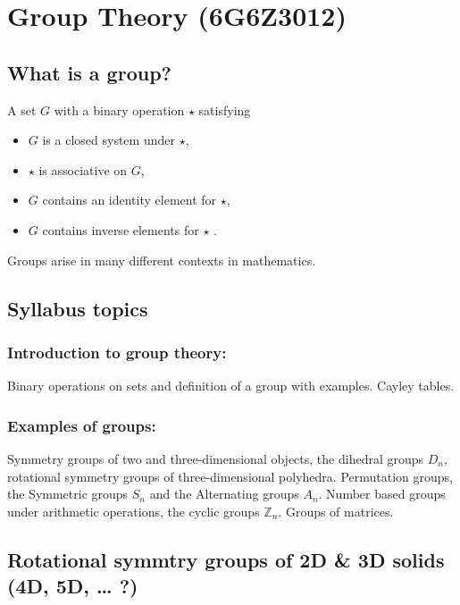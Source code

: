 \section{Group Theory (6G6Z3012)}\label{group-theory-6g6z3012}

\subsection{What is a group?}\label{what-is-a-group}

A set $G$ with a binary operation $\star$ satisfying

\begin{itemize}
\itemsep1pt\parskip0pt
\item
  $G$ is a closed system under $\star$,
\item
  $\star$ is associative on $G$,
\item
  $G$ contains an identity element for $\star$,
\item
  $G$ contains inverse elements for $\star$ .
\end{itemize}

Groups arise in many different contexts in mathematics.

\subsection{Syllabus topics}\label{syllabus-topics}

\subsubsection{Introduction to group
theory:}\label{introduction-to-group-theory}

Binary operations on sets and definition of a group with examples.
Cayley tables.

\subsubsection{Examples of groups:}\label{examples-of-groups}

Symmetry groups of two and three-dimensional objects, the dihedral
groups $D_n$, rotational symmetry groups of three-dimensional polyhedra.
Permutation groups, the Symmetric groups $S_n$ and the Alternating
groups $A_n$. Number based groups under arithmetic operations, the
cyclic groups $\mathbb{Z}_n$. Groups of matrices.

\subsection{Rotational symmtry groups of 2D \& 3D solids (4D, 5D,
\ldots{} ?)}\label{rotational-symmtry-groups-of-2d-3d-solids-4d-5d}

